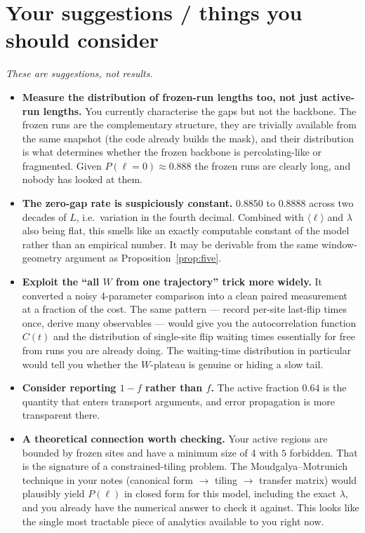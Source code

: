 \documentclass[11pt,a4paper]{article}
\begin{document}
\section*{Your suggestions / things you should consider}

\emph{These are suggestions, not results.}

\begin{itemize}
\item \textbf{Measure the distribution of frozen-run lengths too, not just
active-run lengths.} You currently characterise the gaps but not the
backbone. The frozen runs are the complementary structure, they are trivially
available from the same snapshot (the code already builds the mask), and
their distribution is what determines whether the frozen backbone is
percolating-like or fragmented. Given $P(\ell=0)\approx0.888$ the frozen
runs are clearly long, and nobody has looked at them.

\item \textbf{The zero-gap rate is suspiciously constant.} $0.8850$ to
$0.8888$ across two decades of $L$, i.e.\ variation in the fourth decimal.
Combined with $\langle\ell\rangle$ and $\lambda$ also being flat, this
smells like an exactly computable constant of the model rather than an
empirical number. It may be derivable from the same window-geometry
argument as Proposition~\ref{prop:five}.

\item \textbf{Exploit the ``all $W$ from one trajectory'' trick more
widely.} It converted a noisy 4-parameter comparison into a clean paired
measurement at a fraction of the cost. The same pattern --- record per-site
last-flip times once, derive many observables --- would give you the
autocorrelation function $C(t)$ and the distribution of single-site flip
waiting times essentially for free from runs you are already doing. The
waiting-time distribution in particular would tell you whether the
$W$-plateau is genuine or hiding a slow tail.

\item \textbf{Consider reporting $1-f$ rather than $f$.} The active
fraction $0.64$ is the quantity that enters transport arguments, and error
propagation is more transparent there.

\item \textbf{A theoretical connection worth checking.} Your active regions
are bounded by frozen sites and have a minimum size of 4 with $5$ forbidden.
That is the signature of a constrained-tiling problem. The Moudgalya--Motrunich
technique in your notes (canonical form $\to$ tiling $\to$ transfer matrix)
would plausibly yield $P(\ell)$ in closed form for this model, including the
exact $\lambda$, and you already have the numerical answer to check it
against. This looks like the single most tractable piece of analytics
available to you right now.


\end{itemize}
\end{document}
